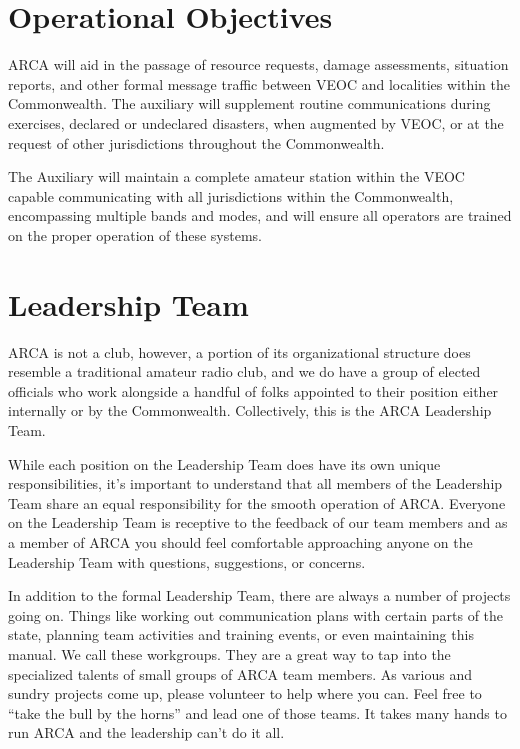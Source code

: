 \documentclass[pdflatex,letterpaper,twoside,12pt]{book}
\begin{document}

\section{Operational Objectives}

ARCA will aid in the passage of resource requests, damage assessments, situation reports, and other formal message traffic between VEOC and localities within the Commonwealth.   The auxiliary will supplement routine communications during exercises, declared or undeclared disasters, when augmented by VEOC, or at the request of other jurisdictions throughout the Commonwealth.

The Auxiliary will maintain a complete amateur station within the VEOC capable communicating with all jurisdictions within the Commonwealth, encompassing multiple bands and modes, and will ensure all operators are trained on the proper operation of these systems.


\section{Leadership Team}

ARCA is not a club, however, a portion of its organizational structure does resemble a traditional amateur radio club, and we do have a group of elected officials who work alongside a handful of folks appointed to their position either internally or by the Commonwealth.  Collectively, this is the ARCA Leadership Team.

While each position on the Leadership Team does have its own unique responsibilities, it's important to understand that all members of the Leadership Team share an equal responsibility for the smooth operation of ARCA.  Everyone on the Leadership Team is receptive to the feedback of our team members and as a member of ARCA you should feel comfortable approaching anyone on the Leadership Team with questions, suggestions, or concerns.

In addition to the formal Leadership Team, there are always a number of projects going on.  Things like working out communication plans with certain parts of the state, planning team activities and training events, or even maintaining this manual.  We call these workgroups.  They are a great way to tap into the specialized talents of small groups of ARCA team members.  As various and sundry projects come up, please volunteer to help where you can.  Feel free to ``take the bull by the horns'' and lead one of those teams.  It takes many hands to run ARCA and the leadership can't do it all.
\end{document}
